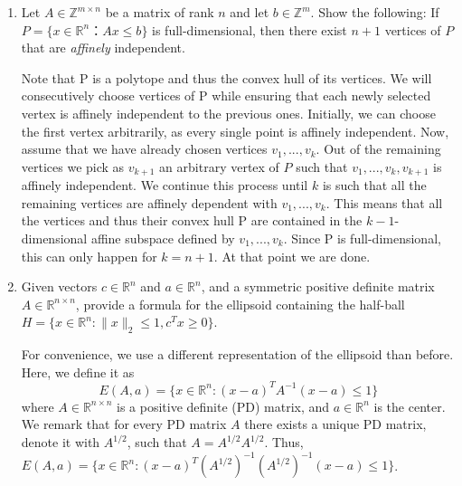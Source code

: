 \documentclass[11pt]{article}
\institute{\'Ecole Polytechnique F\'ed\'erale de Lausanne}
\DeclareMathOperator{\conv}{conv}
\newcommand{\setR}{\mathbb{R}}
\begin{document}
\makeheader

\begin{enumerate}[1)]


    
\item Let $A ∈ ℤ^{m ×n}$ be a matrix of rank $n$ and let $b ∈ ℤ^m$. Show the following: If $P = \{ x ∈ ℝ^n ： Ax ≤ b\}$ is full-dimensional, then there exist $n+1$ vertices of $P$ that are \textit{affinely} independent. 

\begin{solution}
Note that P is a polytope and thus the convex hull of its vertices. We will consecutively choose
vertices of P while ensuring that each newly selected vertex is aﬃnely independent to the previous
ones. Initially, we can choose the first vertex arbitrarily, as every single point is aﬃnely independent.
Now, assume that we have already chosen vertices $v_1,...,v_k$. Out of the remaining vertices we pick
as $v_{k+1}$ an arbitrary vertex of $P$ such that $v_1,...,v_k,v_{k+1}$ is aﬃnely independent. We continue this
process until $k$ is such that all the remaining vertices are aﬃnely dependent with $v_1,...,v_k$. This
means that all the vertices and thus their convex hull P are contained in the $k−1$-dimensional aﬃne
subspace defined by $v_1,...,v_k$. Since P is full-dimensional, this can only happen for $k= n+ 1$. At
that point we are done.
\end{solution}



\item Given vectors $c∈\setR^n$ and $a∈\setR^n$, and a symmetric positive definite matrix $A∈\setR^{n×n}$, provide a formula for the ellipsoid containing the half-ball $H= \{x∈\setR^n : ∥x∥_2≤1, c^Tx≥0\}$.
  
  
 \begin{solution}
For convenience, we use a diﬀerent representation of the ellipsoid than before. Here, we define it as
$$E(A,a) = \{x∈\setR^n :(x−a)^T A^{-1}(x−a) ≤1\}$$
where $A∈\setR^{n×n}$ is a positive definite (PD) matrix, and $a∈\setR^n$ is the center. We remark that for every PD matrix
$A$ there exists a unique PD matrix, denote it with $A^{1/2}$, such that $A= A^{1/2}A^{1/2}$. Thus,
$E(A,a) = \{x∈\setR^n :(x−a)^T {(A^{1/2})}^{−1}
{(A^{1/2})}^{−1}(x−a) ≤1\}$.


\end{solution}
\end{enumerate}
\end{document}
